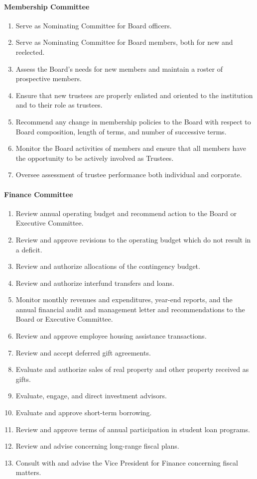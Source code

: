 \documentclass[letterpaper, 11pt]{article}
\begin{document}
			\paragraph{Membership Committee}
				\begin{enumerate}
					\item{Serve as Nominating Committee for Board officers.}
					\item{Serve as Nominating Committee for Board members, both for new and reelected.}
					\item{Assess the Board's needs for new members and maintain a roster of prospective members.}
					\item{Ensure that new trustees are properly enlisted and oriented to the institution and to their role as trustees.}
					\item{Recommend any change in membership policies to the Board with respect to Board composition, length of terms, and number of successive terms.}
					\item{Monitor the Board activities of members and ensure that all members have the opportunity to be actively involved as Trustees.}
					\item{Oversee assessment of trustee performance both individual and corporate.}
				\end{enumerate}
			\paragraph{Finance Committee}
				\begin{enumerate}
					\item{Review annual operating budget and recommend action to the Board or Executive Committee.}
					\item{Review and approve revisions to the operating budget which do not result in a deficit.}
					\item{Review and authorize allocations of the contingency budget.}
					\item{Review and authorize interfund transfers and loans.}
					\item{Monitor monthly revenues and expenditures, year-end reports, and the annual financial audit and management letter and recommendations to the Board or Executive Committee.}
					\item{Review and approve employee housing assistance transactions.}
					\item{Review and accept deferred gift agreements.}
					\item{Evaluate and authorize sales of real property and other property received as gifts.}
					\item{Evaluate, engage, and direct investment advisors.}
					\item{Evaluate and approve short-term borrowing.}
					\item{Review and approve terms of annual participation in student loan programs.}
					\item{Review and advise concerning long-range fiscal plans.}
					\item{Consult with and advise the Vice President for Finance concerning fiscal matters.}
				\end{enumerate}
\end{document}
